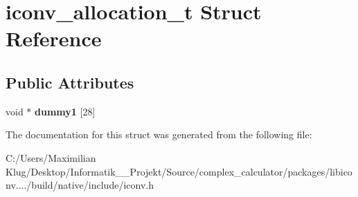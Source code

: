 \hypertarget{structiconv__allocation__t}{}\section{iconv\+\_\+allocation\+\_\+t Struct Reference}
\label{structiconv__allocation__t}
\subsection*{Public Attributes}
\begin{DoxyCompactItemize}
\item 
\mbox{\label{structiconv__allocation__t_ac6b444256d2868f83bcb512944ade298}} 
void $\ast$ {\bfseries dummy1} \mbox{[}28\mbox{]}
\end{DoxyCompactItemize}


The documentation for this struct was generated from the following file\+:\begin{DoxyCompactItemize}
\item 
C\+:/\+Users/\+Maximilian Klug/\+Desktop/\+Informatik\+\_\+\_\+\+Projekt/\+Source/complex\+\_\+calculator/packages/libiconv..../build/native/include/iconv.\+h\end{DoxyCompactItemize}
